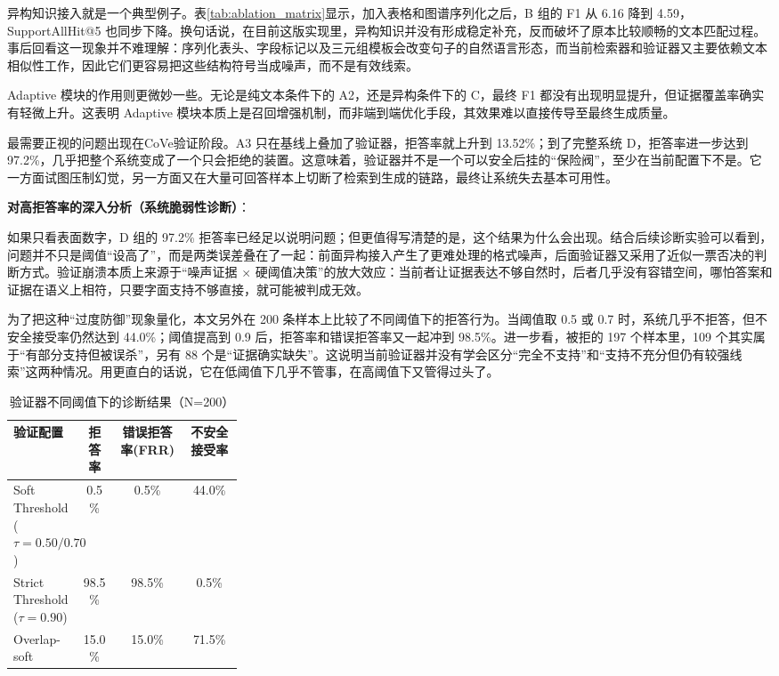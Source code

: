 异构知识接入就是一个典型例子。表\ref{tab:ablation_matrix}显示，加入表格和图谱序列化之后，B 组的 F1 从 6.16 降到 4.59，SupportAllHit@5 也同步下降。换句话说，在目前这版实现里，异构知识并没有形成稳定补充，反而破坏了原本比较顺畅的文本匹配过程。事后回看这一现象并不难理解：序列化表头、字段标记以及三元组模板会改变句子的自然语言形态，而当前检索器和验证器又主要依赖文本相似性工作，因此它们更容易把这些结构符号当成噪声，而不是有效线索。

Adaptive 模块的作用则更微妙一些。无论是纯文本条件下的 A2，还是异构条件下的 C，最终 F1 都没有出现明显提升，但证据覆盖率确实有轻微上升。这表明 Adaptive 模块本质上是召回增强机制，而非端到端优化手段，其效果难以直接传导至最终生成质量。

最需要正视的问题出现在CoVe验证阶段。A3 只在基线上叠加了验证器，拒答率就上升到 13.52\%；到了完整系统 D，拒答率进一步达到 97.2\%，几乎把整个系统变成了一个只会拒绝的装置。这意味着，验证器并不是一个可以安全后挂的“保险阀”，至少在当前配置下不是。它一方面试图压制幻觉，另一方面又在大量可回答样本上切断了检索到生成的链路，最终让系统失去基本可用性。

\textbf{对高拒答率的深入分析（系统脆弱性诊断）}：

如果只看表面数字，D 组的 97.2\% 拒答率已经足以说明问题；但更值得写清楚的是，这个结果为什么会出现。结合后续诊断实验可以看到，问题并不只是阈值“设高了”，而是两类误差叠在了一起：前面异构接入产生了更难处理的格式噪声，后面验证器又采用了近似一票否决的判断方式。验证崩溃本质上来源于“噪声证据 $\times$ 硬阈值决策”的放大效应：当前者让证据表达不够自然时，后者几乎没有容错空间，哪怕答案和证据在语义上相符，只要字面支持不够直接，就可能被判成无效。

为了把这种“过度防御”现象量化，本文另外在 200 条样本上比较了不同阈值下的拒答行为。当阈值取 0.5 或 0.7 时，系统几乎不拒答，但不安全接受率仍然达到 44.0\%；阈值提高到 0.9 后，拒答率和错误拒答率又一起冲到 98.5\%。进一步看，被拒的 197 个样本里，109 个其实属于“有部分支持但被误杀”，另有 88 个是“证据确实缺失”。这说明当前验证器并没有学会区分“完全不支持”和“支持不充分但仍有较强线索”这两种情况。用更直白的话说，它在低阈值下几乎不管事，在高阈值下又管得过头了。

\begin{table}[!htbp]
\centering
\caption{验证器不同阈值下的诊断结果（N=200）}
\label{tab:verifier_threshold_diag}
\small
\begin{tabular}{|p{0.30\linewidth}|c|c|c|}
\hline
\textbf{验证配置} & \textbf{拒答率} & \textbf{错误拒答率(FRR)} & \textbf{不安全接受率} \\
\hline
Soft Threshold ($\tau=0.50/0.70$) & 0.5\% & 0.5\% & 44.0\% \\
\hline
Strict Threshold ($\tau=0.90$) & 98.5\% & 98.5\% & 0.5\% \\
\hline
Overlap-soft & 15.0\% & 15.0\% & 71.5\% \\
\hline
\end{tabular}
\end{table}

